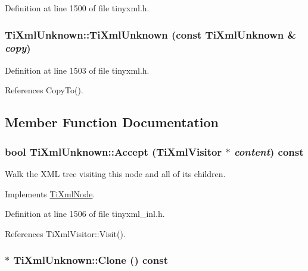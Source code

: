 Definition at line 1500 of file tinyxml.h.\hypertarget{class_ti_xml_unknown_abe798ff4feea31474850c7f0de6bdf5e}{
\subsubsection[{TiXmlUnknown}]{\setlength{\rightskip}{0pt plus 5cm}TiXmlUnknown::TiXmlUnknown (const {\bf TiXmlUnknown} \& {\em copy})}}
\label{class_ti_xml_unknown_abe798ff4feea31474850c7f0de6bdf5e}


Definition at line 1503 of file tinyxml.h.

References CopyTo().

\subsection{Member Function Documentation}
\hypertarget{class_ti_xml_unknown_a4e54d7482e05a837cf83c925cc683380}{
\subsubsection[{Accept}]{\setlength{\rightskip}{0pt plus 5cm}bool TiXmlUnknown::Accept ({\bf TiXmlVisitor} $\ast$ {\em content}) const}}
\label{class_ti_xml_unknown_a4e54d7482e05a837cf83c925cc683380}
Walk the XML tree visiting this node and all of its children. 

Implements \hyperlink{class_ti_xml_node_acc0f88b7462c6cb73809d410a4f5bb86}{TiXmlNode}.

Definition at line 1506 of file tinyxml\_\-inl.h.

References TiXmlVisitor::Visit().\hypertarget{class_ti_xml_unknown_a675c4b2684af35e4c7649b7fd5ae598d}{
\subsubsection[{Clone}]{ $\ast$ TiXmlUnknown::Clone () const}}
\label{class_ti_xml_unknown_a675c4b2684af35e4c7649b7fd5ae598d}


